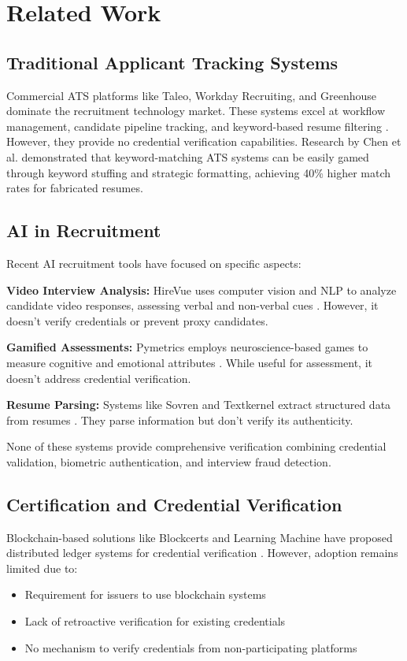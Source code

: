 \documentclass[journal]{IEEEtran}
\begin{document}
\section{Related Work}

\subsection{Traditional Applicant Tracking Systems}
Commercial ATS platforms like Taleo, Workday Recruiting, and Greenhouse dominate the recruitment technology market. These systems excel at workflow management, candidate pipeline tracking, and keyword-based resume filtering \cite{ats_market_2023}. However, they provide no credential verification capabilities. Research by Chen et al. \cite{chen_ats_2022} demonstrated that keyword-matching ATS systems can be easily gamed through keyword stuffing and strategic formatting, achieving 40\% higher match rates for fabricated resumes.

\subsection{AI in Recruitment}
Recent AI recruitment tools have focused on specific aspects:

\textbf{Video Interview Analysis:} HireVue uses computer vision and NLP to analyze candidate video responses, assessing verbal and non-verbal cues \cite{hirevue_study_2023}. However, it doesn't verify credentials or prevent proxy candidates.

\textbf{Gamified Assessments:} Pymetrics employs neuroscience-based games to measure cognitive and emotional attributes \cite{pymetrics_validation_2021}. While useful for assessment, it doesn't address credential verification.

\textbf{Resume Parsing:} Systems like Sovren and Textkernel extract structured data from resumes \cite{resume_parsing_2022}. They parse information but don't verify its authenticity.

None of these systems provide comprehensive verification combining credential validation, biometric authentication, and interview fraud detection.

\subsection{Certification and Credential Verification}
Blockchain-based solutions like Blockcerts and Learning Machine have proposed distributed ledger systems for credential verification \cite{blockchain_credentials_2021}. However, adoption remains limited due to:
\begin{itemize}
\item Requirement for issuers to use blockchain systems
\item Lack of retroactive verification for existing credentials
\item No mechanism to verify credentials from non-participating platforms
\end{itemize}
\end{document}
